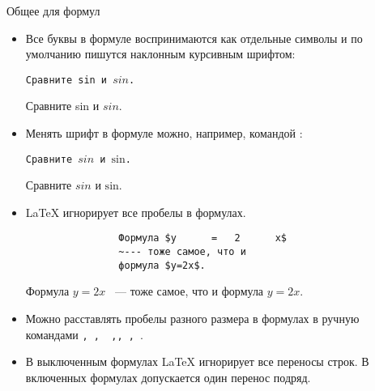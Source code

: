\begin{frame}[fragile]{Общее для формул}
	
	\begin{itemize}
		\item Все буквы в формуле воспринимаются как отдельные символы и по умолчанию пишутся наклонным курсивным шрифтом:  
		
		\begin{minipage}{0.44\textwidth}
			\texttt{Сравните sin и $sin$.}
		\end{minipage}
		\begin{minipage}{0.44\textwidth}
			\begin{center}
				Сравните sin и $sin$.
			\end{center}
		\end{minipage} 
		
		\item Менять шрифт в формуле можно, например, командой \texttt{\mathrm}:
		
		\begin{minipage}{0.44\textwidth}
			\texttt{Сравните $sin$ и $\mathrm{sin}$.}
		\end{minipage}
		\begin{minipage}{0.44\textwidth}
			\begin{center}
				Сравните $sin$ и $\mathrm{sin}$.
			\end{center}
		\end{minipage}
		
		\item \LaTeX{} игнорирует все пробелы в формулах.
		
		\begin{minipage}{0.44\textwidth}
			\begin{verbatim}
				Формула $y      =   2      x$
				~--- тоже самое, что и 
				формула $y=2x$. 
			\end{verbatim}
		\end{minipage}
		\begin{minipage}{0.44\textwidth}
				Формула $y      =   2      x$
				~--- тоже самое, что и 
				формула $y=2x$.
		\end{minipage}
		\item Можно расставлять пробелы разного размера в формулах в ручную командами 
		\texttt{\quad, \qquad, \,,\:, \;, \!}.
		
		\item В выключенным формулах \LaTeX{} игнорирует все переносы строк. В включенных формулах допускается один перенос подряд.
	\end{itemize}

	 
	
	
\end{frame}



